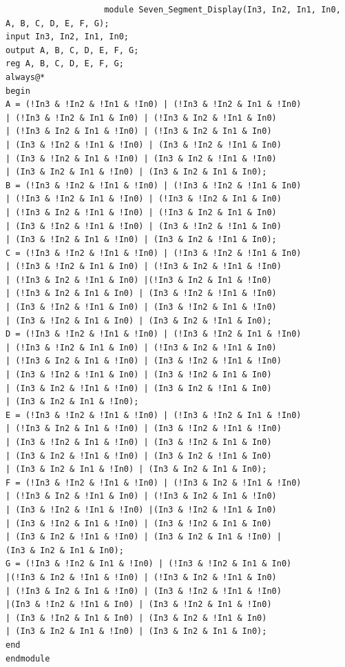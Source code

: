 \documentclass[12pt]{article}
\begin{document}
				\begin{verbatim}
					module Seven_Segment_Display(In3, In2, In1, In0, A, B, C, D, E, F, G);
input In3, In2, In1, In0;
output A, B, C, D, E, F, G;
reg A, B, C, D, E, F, G;
always@*
begin
A = (!In3 & !In2 & !In1 & !In0) | (!In3 & !In2 & In1 & !In0)
| (!In3 & !In2 & In1 & In0) | (!In3 & In2 & !In1 & In0)
| (!In3 & In2 & In1 & !In0) | (!In3 & In2 & In1 & In0)
| (In3 & !In2 & !In1 & !In0) | (In3 & !In2 & !In1 & In0)
| (In3 & !In2 & In1 & !In0) | (In3 & In2 & !In1 & !In0)
| (In3 & In2 & In1 & !In0) | (In3 & In2 & In1 & In0);
B = (!In3 & !In2 & !In1 & !In0) | (!In3 & !In2 & !In1 & In0)
| (!In3 & !In2 & In1 & !In0) | (!In3 & !In2 & In1 & In0)
| (!In3 & In2 & !In1 & !In0) | (!In3 & In2 & In1 & In0)
| (In3 & !In2 & !In1 & !In0) | (In3 & !In2 & !In1 & In0)
| (In3 & !In2 & In1 & !In0) | (In3 & In2 & !In1 & In0);
C = (!In3 & !In2 & !In1 & !In0) | (!In3 & !In2 & !In1 & In0)
| (!In3 & !In2 & In1 & In0) | (!In3 & In2 & !In1 & !In0)
| (!In3 & In2 & !In1 & In0) |(!In3 & In2 & In1 & !In0)
| (!In3 & In2 & In1 & In0) | (In3 & !In2 & !In1 & !In0)
| (In3 & !In2 & !In1 & In0) | (In3 & !In2 & In1 & !In0)
| (In3 & !In2 & In1 & In0) | (In3 & In2 & !In1 & In0);
D = (!In3 & !In2 & !In1 & !In0) | (!In3 & !In2 & In1 & !In0)
| (!In3 & !In2 & In1 & In0) | (!In3 & In2 & !In1 & In0)
| (!In3 & In2 & In1 & !In0) | (In3 & !In2 & !In1 & !In0)
| (In3 & !In2 & !In1 & In0) | (In3 & !In2 & In1 & In0)
| (In3 & In2 & !In1 & !In0) | (In3 & In2 & !In1 & In0)
| (In3 & In2 & In1 & !In0);
E = (!In3 & !In2 & !In1 & !In0) | (!In3 & !In2 & In1 & !In0)
| (!In3 & In2 & In1 & !In0) | (In3 & !In2 & !In1 & !In0)
| (In3 & !In2 & In1 & !In0) | (In3 & !In2 & In1 & In0)
| (In3 & In2 & !In1 & !In0) | (In3 & In2 & !In1 & In0)
| (In3 & In2 & In1 & !In0) | (In3 & In2 & In1 & In0);
F = (!In3 & !In2 & !In1 & !In0) | (!In3 & In2 & !In1 & !In0)
| (!In3 & In2 & !In1 & In0) | (!In3 & In2 & In1 & !In0)
| (In3 & !In2 & !In1 & !In0) |(In3 & !In2 & !In1 & In0)
| (In3 & !In2 & In1 & !In0) | (In3 & !In2 & In1 & In0)
| (In3 & In2 & !In1 & !In0) | (In3 & In2 & In1 & !In0) |
(In3 & In2 & In1 & In0);
G = (!In3 & !In2 & In1 & !In0) | (!In3 & !In2 & In1 & In0)
|(!In3 & In2 & !In1 & !In0) | (!In3 & In2 & !In1 & In0)
| (!In3 & In2 & In1 & !In0) | (In3 & !In2 & !In1 & !In0)
|(In3 & !In2 & !In1 & In0) | (In3 & !In2 & In1 & !In0)
| (In3 & !In2 & In1 & In0) | (In3 & In2 & !In1 & In0)
| (In3 & In2 & In1 & !In0) | (In3 & In2 & In1 & In0);
end
endmodule
				\end{verbatim}
		
\end{document}
